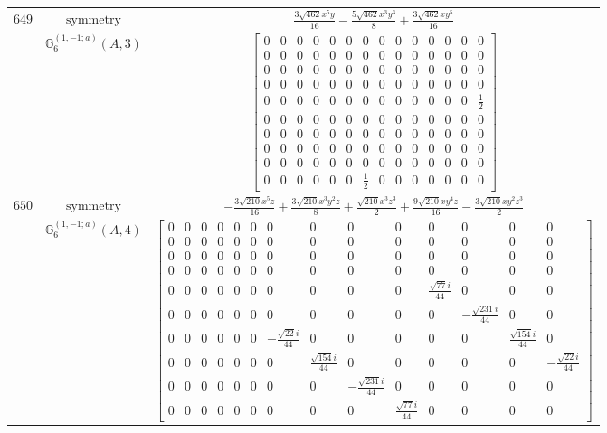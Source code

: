 \documentclass[fleqn,8pt,landscape]{jsarticle}
\begin{document}
\begin{longtable}{ccc}
$ 649 $ & $ \text{symmetry} $ & $ \frac{3 \sqrt{462} x^{5} y}{16} - \frac{5 \sqrt{462} x^{3} y^{3}}{8} + \frac{3 \sqrt{462} x y^{5}}{16} $ \\
$  $ & $ \mathbb{G}_{6}^{(1,-1;a)}(A,3) $ & $ \begin{bmatrix} 0 & 0 & 0 & 0 & 0 & 0 & 0 & 0 & 0 & 0 & 0 & 0 & 0 & 0 \\ 0 & 0 & 0 & 0 & 0 & 0 & 0 & 0 & 0 & 0 & 0 & 0 & 0 & 0 \\ 0 & 0 & 0 & 0 & 0 & 0 & 0 & 0 & 0 & 0 & 0 & 0 & 0 & 0 \\ 0 & 0 & 0 & 0 & 0 & 0 & 0 & 0 & 0 & 0 & 0 & 0 & 0 & 0 \\ 0 & 0 & 0 & 0 & 0 & 0 & 0 & 0 & 0 & 0 & 0 & 0 & 0 & \frac{1}{2} \\ 0 & 0 & 0 & 0 & 0 & 0 & 0 & 0 & 0 & 0 & 0 & 0 & 0 & 0 \\ 0 & 0 & 0 & 0 & 0 & 0 & 0 & 0 & 0 & 0 & 0 & 0 & 0 & 0 \\ 0 & 0 & 0 & 0 & 0 & 0 & 0 & 0 & 0 & 0 & 0 & 0 & 0 & 0 \\ 0 & 0 & 0 & 0 & 0 & 0 & 0 & 0 & 0 & 0 & 0 & 0 & 0 & 0 \\ 0 & 0 & 0 & 0 & 0 & 0 & \frac{1}{2} & 0 & 0 & 0 & 0 & 0 & 0 & 0 \end{bmatrix} $ \\ \hline
$ 650 $ & $ \text{symmetry} $ & $ - \frac{3 \sqrt{210} x^{5} z}{16} + \frac{3 \sqrt{210} x^{3} y^{2} z}{8} + \frac{\sqrt{210} x^{3} z^{3}}{2} + \frac{9 \sqrt{210} x y^{4} z}{16} - \frac{3 \sqrt{210} x y^{2} z^{3}}{2} $ \\
$  $ & $ \mathbb{G}_{6}^{(1,-1;a)}(A,4) $ & $ \begin{bmatrix} 0 & 0 & 0 & 0 & 0 & 0 & 0 & 0 & 0 & 0 & 0 & 0 & 0 & 0 \\ 0 & 0 & 0 & 0 & 0 & 0 & 0 & 0 & 0 & 0 & 0 & 0 & 0 & 0 \\ 0 & 0 & 0 & 0 & 0 & 0 & 0 & 0 & 0 & 0 & 0 & 0 & 0 & 0 \\ 0 & 0 & 0 & 0 & 0 & 0 & 0 & 0 & 0 & 0 & 0 & 0 & 0 & 0 \\ 0 & 0 & 0 & 0 & 0 & 0 & 0 & 0 & 0 & 0 & \frac{\sqrt{77} i}{44} & 0 & 0 & 0 \\ 0 & 0 & 0 & 0 & 0 & 0 & 0 & 0 & 0 & 0 & 0 & - \frac{\sqrt{231} i}{44} & 0 & 0 \\ 0 & 0 & 0 & 0 & 0 & 0 & - \frac{\sqrt{22} i}{44} & 0 & 0 & 0 & 0 & 0 & \frac{\sqrt{154} i}{44} & 0 \\ 0 & 0 & 0 & 0 & 0 & 0 & 0 & \frac{\sqrt{154} i}{44} & 0 & 0 & 0 & 0 & 0 & - \frac{\sqrt{22} i}{44} \\ 0 & 0 & 0 & 0 & 0 & 0 & 0 & 0 & - \frac{\sqrt{231} i}{44} & 0 & 0 & 0 & 0 & 0 \\ 0 & 0 & 0 & 0 & 0 & 0 & 0 & 0 & 0 & \frac{\sqrt{77} i}{44} & 0 & 0 & 0 & 0 \end{bmatrix} $ \\ \hline

\end{longtable}
\end{document}
